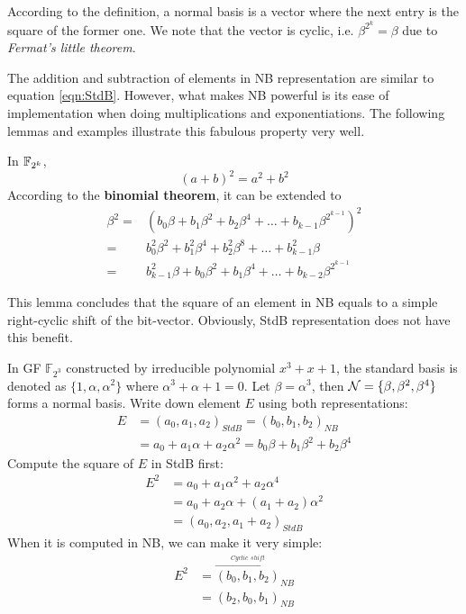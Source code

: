 According to the definition, a normal basis is a vector where the next entry is the square of the former one.
We note that the vector is cyclic, i.e. $\beta^{2^k} = \beta$ due to {\it Fermat's little theorem}.

The addition and subtraction of elements in NB representation are similar to equation \ref{eqn:StdB}.
However, what makes NB powerful is its ease of implementation when doing multiplications and exponentiations.
The following lemmas and examples illustrate this fabulous property very well.
\begin{Lemma}[Square of NB]
\label{lem:squareNB}
In ${\mathbb{F}}_{2^k}$, 
\begin{equation*}
(a+b)^2 = a^2 + b^2
\end{equation*}
According to the \textbf{binomial theorem}, it can be extended to
\begin{align*}
\beta^2 =&(b_0\beta + b_1\beta^2 + b_2\beta^4 + \dots + b_{k-1}\beta^{2^{k-1}})^2 \\
=& b_0^2\beta^2 + b_1^2\beta^4 + b_2^2\beta^8 + \dots + b_{k-1}^2\beta \\
=& b_{k-1}^2\beta + b_0\beta^2 + b_1\beta^4 + \dots + b_{k-2}\beta^{2^{k-1}}
\end{align*}
\end{Lemma}
This lemma concludes that the square of an element in NB equals to a simple right-cyclic shift of the bit-vector.
Obviously, StdB representation does not have this benefit.

\begin{Example}[Square of NB]
In GF $\mathbb F_{2^3}$ constructed by irreducible polynomial $x^3 + x + 1$, the standard basis is denoted as 
$\{ 1, \alpha, \alpha^2\}$ where $\alpha^3+\alpha+1=0$.
Let $\beta = \alpha^3$, then ${\mathcal{N}} = \{ \beta, \beta^2, \beta^4\}$ forms a normal basis. 
Write down element $E$ using both representations:
\begin{align*}
E &= (a_0,a_1,a_2)_{StdB} = (b_0,b_1,b_2)_{NB} \\
  &= a_0 + a_1\alpha + a_2\alpha^2 = b_0\beta + b_1\beta^2 + b_2\beta^4
\end{align*}
Compute the square of $E$ in StdB first:
\begin{align*}
E^2 &= a_0 + a_1\alpha^2 + a_2\alpha^4 \\
    &= a_0 + a_2\alpha + (a_1 + a_2)\alpha^2 \\
    &= (a_0,a_2,a_1+a_2)_{StdB}
\end{align*}
When it is computed in NB, we can make it very simple:
\begin{align*}
E^2 &= \overset{\xrightarrow{Cyclic~~shift}}{(b_0,b_1,b_2)}_{NB} \\
	&= (b_2,b_0,b_1)_{NB}
\end{align*}
\end{Example}

